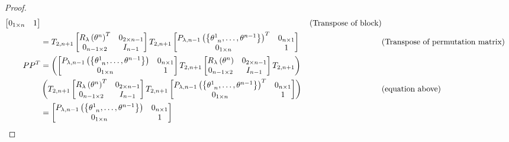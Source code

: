 \documentclass[../main.tex]{subfiles}
\begin{document}
\begin{proof}
\begin{align*}
\begin{bmatrix}
0_{1\times n}&1\\
\end{bmatrix}
&&\text{(Transpose of block)}\\
&=
T_{2,n+1}
\begin{bmatrix}
R_\lambda\left(\tensor{\theta}{^n}\right)^T&0_{{2}\times{n-1}}\\
0_{{n-1}\times{2}}&{I}_{n-1}\\
\end{bmatrix}
T_{2,n+1}
\begin{bmatrix}
P_{\lambda,n-1}\left(\left\{\tensor{\theta}{^1_{n}},\dots,\tensor{\theta}{^{n-1}}\right\}\right)^T&0_{n\times 1}\\
0_{1\times n}&1\\
\end{bmatrix}
&&\text{(Transpose of permutation matrix)}\\
PP^T
&=
\left(\begin{bmatrix}
P_{\lambda,n-1}\left(\left\{\tensor{\theta}{^1_{n}},\dots,\tensor{\theta}{^{n-1}}\right\}\right)&0_{n\times 1}\\
0_{1\times n}&1\\
\end{bmatrix}
T_{2,n+1}
\begin{bmatrix}
R_\lambda\left(\tensor{\theta}{^n}\right)&0_{{2}\times{n-1}}\\
0_{{n-1}\times{2}}&{I}_{n-1}\\
\end{bmatrix}
T_{2,n+1}\right)\\
&\left(T_{2,n+1}
\begin{bmatrix}
R_\lambda\left(\tensor{\theta}{^n}\right)^T&0_{{2}\times{n-1}}\\
0_{{n-1}\times{2}}&{I}_{n-1}\\
\end{bmatrix}
T_{2,n+1}
\begin{bmatrix}
P_{\lambda,n-1}\left(\left\{\tensor{\theta}{^1_{n}},\dots,\tensor{\theta}{^{n-1}}\right\}\right)^T&0_{n\times 1}\\
0_{1\times n}&1\\
\end{bmatrix}\right)
&&\text{(equation above)}\\
&=
\begin{bmatrix}
P_{\lambda,n-1}\left(\left\{\tensor{\theta}{^1_{n}},\dots,\tensor{\theta}{^{n-1}}\right\}\right)&0_{n\times 1}\\
0_{1\times n}&1\\
\end{bmatrix}

\end{align*}
\end{proof}
\end{document}

